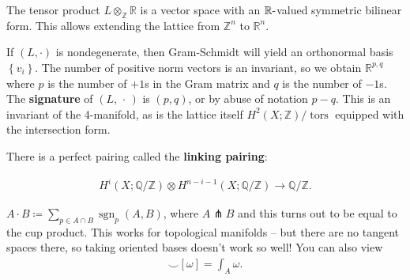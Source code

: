 \begin{definition}[?]

The tensor product \(L \otimes_{\mathbb{Z}}{\mathbb{R}}\) is a vector
space with an \({\mathbb{R}}{\hbox{-}}\)valued symmetric bilinear form.
This allows extending the lattice from \({\mathbb{Z}}^n\) to
\({\mathbb{R}}^n\).

\end{definition}

\begin{remark}

If \((L, \cdot)\) is nondegenerate, then Gram-Schmidt will yield an
orthonormal basis \(\left\{{ v_i }\right\}\). The number of positive
norm vectors is an invariant, so we obtain \({\mathbb{R}}^{p, q}\) where
\(p\) is the number of \(+1\)s in the Gram matrix and \(q\) is the
number of \(-1\)s. The \textbf{signature} of \((L, {\,\cdot\,})\) is
\((p, q)\), or by abuse of notation \(p-q\). This is an invariant of the
4-manifold, as is the lattice itself
\(H^2(X; {\mathbb{Z}})/{\operatorname{tors}}\) equipped with the
intersection form.

\end{remark}

\begin{remark}

There is a perfect pairing called the \textbf{linking pairing}:

\begin{align*}
H^i(X; {\mathbb{Q}}/{\mathbb{Z}}) \otimes H^{n-i-1}(X; {\mathbb{Q}}/{\mathbb{Z}}) \to {\mathbb{Q}}/{\mathbb{Z}}
.\end{align*}

\begin{figure}
\centering
{}
\end{figure}

\end{remark}

\begin{remark}

\(A \cdot B \coloneqq\sum_{p\in A \cap B} \operatorname{sgn}_p(A, B)\),
where \(A \pitchfork B\) and this turns out to be equal to the cup
product. This works for topological manifolds -- but there are no
tangent spaces there, so taking oriented bases doesn't work so well! You
can also view
\begin{align*}
[A] \smile[\omega] = \int_A \omega
.\end{align*}

\end{remark}

